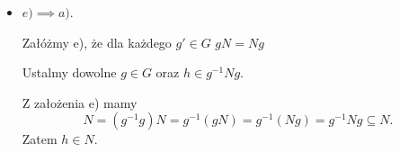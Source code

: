 \begin{solution}
\begin{itemize}
			\begin{align*}
				h \in gN & \iff \left(\text{z d) } N = g^{-1}Ng\text{, dla } g' = g^{-1}\right) \\
				h \in g\left( g^{-1}Ng \right) & \iff \\
				h \in \left( gg^{-1} \right) N g & \iff\\
				h \in Ng
			\end{align*}

			Zatem $gN = Ng$
		\item $e) \implies a)$.

			Załóżmy e), że dla każdego  $g' \in G$ $gN = Ng$

			Ustalmy dowolne $g\in G$ oraz $h\in g^{-1}Ng$.

			Z założenia e) mamy
			\[
			N = \left( g^{-1}g \right)N = g^{-1}\left( gN \right) = g^{-1}\left( Ng \right) = g^{-1}Ng \subseteq N
			.\] 
			Zatem $h \in N.$
	\end{itemize}

\end{solution}

